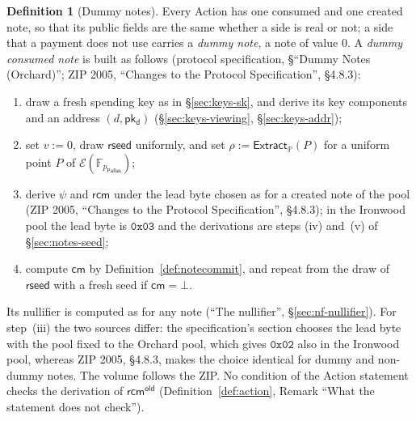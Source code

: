\documentclass[11pt,a4paper]{article}
\theoremstyle{definition}
\newtheorem{definition}[theorem]{Definition}
\newcommand{\F}{\mathbb{F}}
\newcommand{\PP}{\mathbb{P}}
\newcommand{\cmsym}{\mathsf{cm}}
\newcommand{\Pallas}{\ensuremath{\mathsf{Pallas}}}
\newcommand{\Ep}{\ensuremath{\mathcal{E}}}
\newcommand{\Extract}{\ensuremath{\mathsf{Extract}}}
\newcommand{\pkd}{\ensuremath{\mathsf{pk_d}}}
\newcommand{\rcm}{\ensuremath{\mathsf{rcm}}}
\begin{document}
\begin{definition}[Dummy notes]
Every Action has one consumed and one created note, so that its public
fields are the same whether a side is real or not; a side that a payment
does not use carries a \emph{dummy note}, a note of value $0$. A
\emph{dummy consumed note} is built as follows (protocol specification,
\S``Dummy Notes (Orchard)''; ZIP 2005, ``Changes to the Protocol
Specification'', \S 4.8.3):
\begin{enumerate}[label=(\roman*)]
\item draw a fresh spending key as in \S\ref{sec:keys-sk}, and derive its
  key components and an address $(d, \pkd)$ (\S\ref{sec:keys-viewing},
  \S\ref{sec:keys-addr});
\item set $v := 0$, draw $\mathsf{rseed}$ uniformly, and set
  $\rho := \Extract_{\PP}(P)$ for a uniform point $P$ of
  $\Ep(\F_{p_{\Pallas}})$;
\item derive $\psi$ and $\rcm$ under the lead byte chosen as for a created
  note of the pool (ZIP 2005, ``Changes to the Protocol Specification'',
  \S 4.8.3); in the Ironwood pool the lead byte is $\mathtt{0x03}$ and the
  derivations are steps (iv) and~(v) of \S\ref{sec:notes-seed};
\item compute $\cmsym$ by Definition~\ref{def:notecommit}, and repeat from
  the draw of $\mathsf{rseed}$ with a fresh seed if $\cmsym = \bot$.
\end{enumerate}
Its nullifier is computed as for any note (``The nullifier'',
\S\ref{sec:nf-nullifier}). For step~(iii) the two sources differ: the
specification's section chooses the lead byte with the pool fixed to the
Orchard pool, which gives $\mathtt{0x02}$ also in the Ironwood pool, whereas
ZIP 2005, \S 4.8.3, makes the choice identical for dummy and non-dummy
notes. The volume follows the ZIP. No condition of the Action statement
checks the derivation of $\rcm^{\mathsf{old}}$ (Definition~\ref{def:action},
Remark ``What the statement does not check'').


\end{definition}
\end{document}
